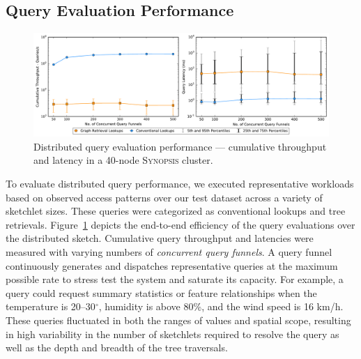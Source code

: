 \subsection{Query Evaluation Performance}
\begin{figure}
    \centerline{\includegraphics[width=\linewidth]{figures/query_benchmark_both.pdf}}
    \caption{Distributed query evaluation performance --- cumulative throughput and latency in a 40-node \textsc{Synopsis} cluster.}
    \label{fig:dist-query}
\end{figure}
To evaluate distributed query performance, we executed representative workloads based on observed access patterns over our test dataset across a variety of sketchlet sizes. These queries were categorized as conventional lookups and tree retrievals.  Figure~\ref{fig:dist-query} depicts the end-to-end efficiency of the query evaluations over the distributed sketch.
Cumulative query throughput and latencies were measured with varying numbers of \emph{concurrent query funnels}.
A query funnel continuously generates and dispatches representative queries at the maximum possible rate to stress test the system and saturate its capacity. For example, a query could request summary statistics or feature relationships when the temperature is 20--30$^{\circ}$, humidity is above 80\%, and the wind speed is 16 km/h.
These queries fluctuated in both the ranges of values and spatial scope, resulting in high variability in the number of sketchlets required to resolve the query as well as the depth and breadth of the tree traversals.

